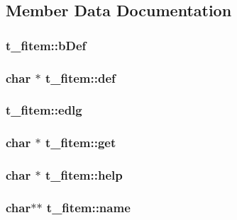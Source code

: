 \subsection{\-Member \-Data \-Documentation}
\hypertarget{structt__fitem_a8ce1832f0645f987d8ecd7b931d04858}{
\subsubsection[{b\-Def}]{ {\bf t\-\_\-fitem\-::b\-Def}}}\label{structt__fitem_a8ce1832f0645f987d8ecd7b931d04858}
\hypertarget{structt__fitem_a87715111036583996d2501bfbd31b724}{
\subsubsection[{def}]{\setlength{\rightskip}{0pt plus 5cm}char $\ast$ {\bf t\-\_\-fitem\-::def}}}\label{structt__fitem_a87715111036583996d2501bfbd31b724}
\hypertarget{structt__fitem_a97de1b38b2633aedc1c0b6907a2f7a73}{
\subsubsection[{edlg}]{ {\bf t\-\_\-fitem\-::edlg}}}\label{structt__fitem_a97de1b38b2633aedc1c0b6907a2f7a73}
\hypertarget{structt__fitem_a74b94c69ba0bd162ea80942c823e1a5c}{
\subsubsection[{get}]{\setlength{\rightskip}{0pt plus 5cm}char $\ast$ {\bf t\-\_\-fitem\-::get}}}\label{structt__fitem_a74b94c69ba0bd162ea80942c823e1a5c}
\hypertarget{structt__fitem_adbd5fc707505e2211a06ead495a31de3}{
\subsubsection[{help}]{\setlength{\rightskip}{0pt plus 5cm}char $\ast$ {\bf t\-\_\-fitem\-::help}}}\label{structt__fitem_adbd5fc707505e2211a06ead495a31de3}
\hypertarget{structt__fitem_aca94f079be77d1c33cab4f9294db708b}{
\subsubsection[{name}]{\setlength{\rightskip}{0pt plus 5cm}char$\ast$$\ast$ {\bf t\-\_\-fitem\-::name}}}\label{structt__fitem_aca94f079be77d1c33cab4f9294db708b}
